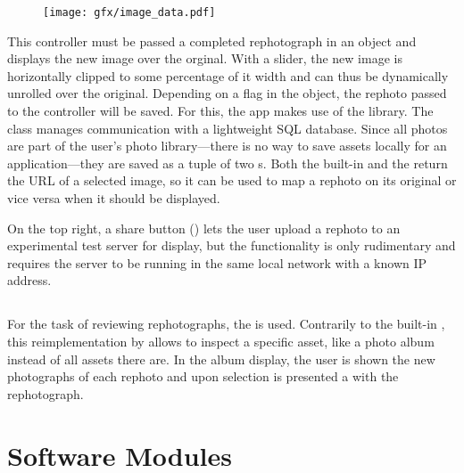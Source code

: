 \setlength\intextsep{0pt}
\begin{figure}
   \texttt{[image: gfx/image\_data.pdf]}
\end{figure}

This controller must be passed a completed rephotograph in an 
object and displays the new image over the orginal. 
With a slider, the new image
is horizontally clipped to some percentage of it width and can thus be
dynamically unrolled over the original. Depending on a flag in the
 object, the rephoto passed to the controller will be saved. For
this, the app makes use of the  library. The  class
manages communication with a lightweight SQL database. Since all photos are
part of the user's photo library---there is no way to save assets locally for an
application---they are saved as a tuple of two s. Both the built-in
 and the  return
the URL of a selected image, so it can be used to map a rephoto on its original
or vice versa when it should be displayed.


On the top right, a share button ()
lets the user upload a rephoto to an experimental test server for display, but the
functionality is only rudimentary and requires the server to be running in the
same local network with a known IP address.

\subsection{}

For the task of reviewing rephotographs, the  is
used. Contrarily to the built-in , this
reimplementation by \citet{nutting2013} allows to inspect a specific asset, like
a photo album instead of all assets there are. In the album display, the user is
shown the new photographs of each rephoto and upon selection is presented a
 with the rephotograph.


\section{Software Modules}

